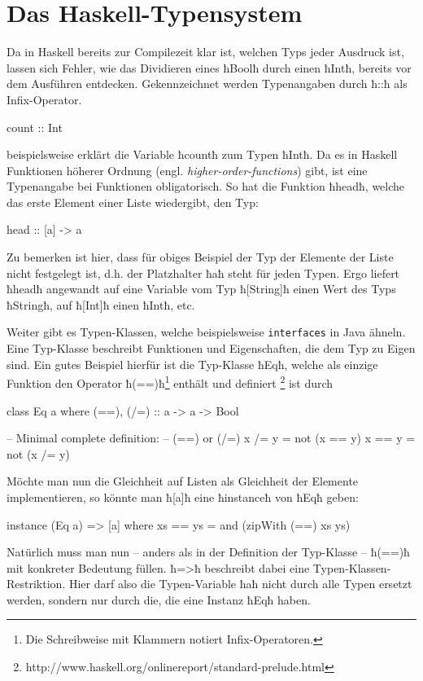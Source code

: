 \section{Das Haskell-Typensystem}
Da in Haskell bereits zur Compilezeit klar ist, welchen Typs jeder Ausdruck
ist, lassen sich Fehler, wie das Dividieren eines ħBoolħ durch einen ħIntħ,
bereits vor dem Ausführen entdecken.
Gekennzeichnet werden Typenangaben durch ħ::ħ als
Infix-Operator.
\begin{hcode}
count :: Int
\end{hcode}
beispielsweise erklärt die Variable ħcountħ zum Typen ħIntħ.
Da es in Haskell Funktionen höherer Ordnung (engl.
\emph{higher-order-functions}) gibt, ist eine Typenangabe bei Funktionen
obligatorisch. 
So hat die Funktion ħheadħ, welche das erste Element einer Liste wiedergibt, 
den Typ:
\begin{hcode}
head :: [a] -> a
\end{hcode}
Zu bemerken ist hier, dass für obiges Beispiel der Typ der Elemente der Liste
nicht festgelegt ist, d.h. der Platzhalter ħaħ steht für jeden Typen.
Ergo liefert ħheadħ angewandt auf eine Variable vom Typ ħ[String]ħ einen Wert
des Typs ħStringħ, auf ħ[Int]ħ einen ħIntħ, etc.

Weiter gibt es Typen-Klassen, welche beispielsweise \texttt{interfaces} in Java
ähneln. Eine Typ-Klasse beschreibt Funktionen und Eigenschaften, die dem Typ zu
Eigen sind.  Ein gutes Beispiel hierfür ist die Typ-Klasse ħEqħ, welche als
einzige Funktion den Operator ħ(==)ħ\footnote{Die Schreibweise mit Klammern
notiert Infix-Operatoren.} enthält und definiert%
\footnote{http://www.haskell.org/onlinereport/standard-prelude.html}
ist durch
\begin{hcode}
class  Eq a  where
  (==), (/=) :: a -> a -> Bool

      -- Minimal complete definition:
      --      (==) or (/=)
  x /= y     =  not (x == y)
  x == y     =  not (x /= y) 
\end{hcode}
Möchte man nun die Gleichheit auf Listen als Gleichheit der Elemente 
implementieren, so könnte man ħ[a]ħ eine ħinstanceħ von ħEqħ geben:
\begin{hcode}
instance (Eq a) => [a] where
  xs == ys  = and (zipWith (==) xs ys)
\end{hcode}
Natürlich muss man nun -- anders als in der Definition der Typ-Klasse -- 
ħ(==)ħ mit konkreter Bedeutung füllen.
ħ=>ħ beschreibt dabei eine Typen-Klassen-Restriktion.
Hier darf also die Typen-Variable ħaħ nicht durch alle Typen ersetzt werden,
sondern nur durch die, die eine Instanz ħEqħ haben. 


